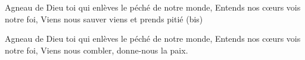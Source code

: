 Agneau de Dieu toi qui enlèves le péché de notre monde, 
Entends nos cœurs vois notre foi, Viens nous sauver viens et prends pitié (bis)

Agneau de Dieu toi qui enlèves le péché de notre monde, 
Entends nos cœurs vois notre foi, Viens nous combler, donne-nous la paix.
